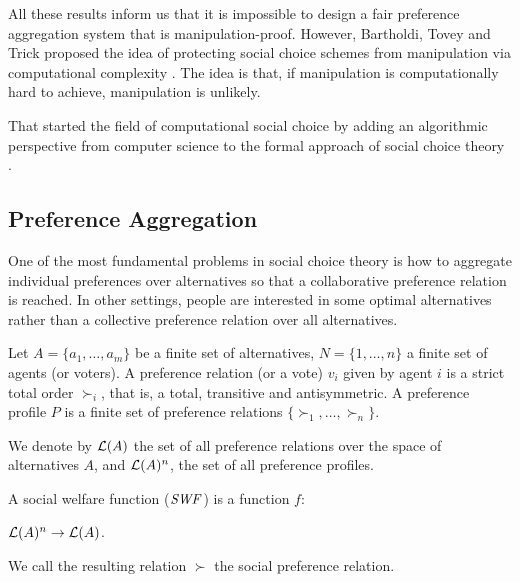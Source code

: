 All these results inform us that it is impossible to design a fair preference
aggregation system that is manipulation-proof.
However, Bartholdi, Tovey and Trick proposed the idea of protecting
social choice schemes from manipulation via computational
complexity \cite{bartholdi:j:whowon,bartholdi:j:compdiff,
bartholdi:j:howhard}.
The idea is that, if manipulation is computationally hard to
achieve, manipulation is unlikely.

That started the field of computational social choice by adding an algorithmic
perspective from computer science to the formal approach 
of social choice theory \cite{Brandt:COMSOC}.




\subsection{Preference Aggregation}
One of the most fundamental problems in social choice theory is how to
aggregate individual preferences over alternatives so that a
collaborative preference relation is reached.
In other settings, people are interested in some optimal alternatives
rather than a collective preference relation over all alternatives.

\begin{definition}
	Let $A=\{a_1,\ldots,a_m\}$ be a finite set of alternatives,
	$N=\{1,\ldots,n\}$ a finite set of agents (or voters).
	A preference relation (or a vote) $v_i$ given by agent $i$ 
	is a strict total order $\succ_i$,
	that is, a total, transitive and antisymmetric.
	A preference profile $P$ is a finite set of preference relations
	$\{\succ_1, \ldots, \succ_n\}$.
\end{definition}

We denote by $\mathcal{L}(A)$ the set of all preference relations over
the space of alternatives $A$, and $\mathcal{L}(A)^n$, the set of all
preference profiles.

\begin{definition}
	A social welfare function ($\it{SWF}$) is a function $f$:
	\begin{center}
		$\mathcal{L}(A)^n \rightarrow \mathcal{L}(A)$.
	\end{center}
	We call the resulting relation $\succ$ the social preference relation.
\end{definition}

